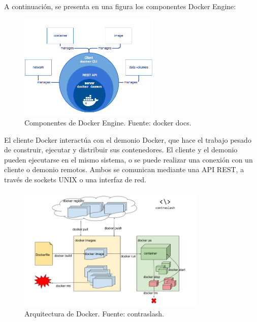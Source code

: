 \newpage

A continuación, se presenta en una figura los componentes Docker Engine:

\begin{figure}[ht]
	\begin{center}
		\includegraphics[width = 0.60\textwidth]{Figuras/DockerComponents.png}
	\end{center}
	\caption{\label{fig:DockerComponents} Componentes de Docker Engine. Fuente: docker docs.}
\end{figure}

El cliente Docker interactúa con el demonio Docker, que hace el trabajo pesado de construir, ejecutar y distribuir sus contenedores. El cliente y el demonio pueden ejecutarse en el mismo sistema, o se puede realizar una conexión con un cliente o demonio remotos. Ambos se comunican mediante una API REST, a través de sockets UNIX o una interfaz de red.

\begin{figure}[ht]
	\begin{center}
		\includegraphics[width = 0.80\textwidth]{Figuras/DockerArchitecture.png}
	\end{center}
	\caption{\label{fig:DockerArchitecture} Arquitectura de Docker. Fuente: contraslash.}
\end{figure}

